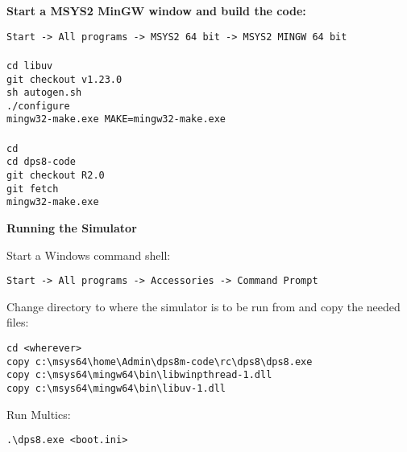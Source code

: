 \textbf{Start a MSYS2 MinGW window and build the code:}

\begin{adjustwidth}{5ex}{1ex}
    \texttt{Start -> All programs -> MSYS2 64 bit -> MSYS2 MINGW 64 bit} \\
\\
    \texttt{cd libuv} \\
    \texttt{git checkout v1.23.0} \\
    \texttt{sh autogen.sh} \\
    \texttt{./configure} \\
    \texttt{mingw32-make.exe MAKE=mingw32-make.exe} \\
\\
    \texttt{cd} \\
    \texttt{cd dps8-code} \\
    \texttt{git checkout R2.0} \\
    \texttt{git fetch} \\
    \texttt{mingw32-make.exe} \\
\end{adjustwidth}  

\textbf{Running the Simulator}

Start a Windows command shell:

\begin{adjustwidth}{5ex}{1ex}
    \texttt{Start -> All programs -> Accessories -> Command Prompt} \\
\end{adjustwidth}  

Change directory to where the simulator is to be run from and copy the needed files:

\begin{adjustwidth}{5ex}{1ex}
    \texttt{cd <wherever>} \\
    \texttt{copy c:\textbackslash{}msys64\textbackslash{}home\textbackslash{}Admin\textbackslash{}dps8m-code\textbackslash{}rc\textbackslash{}dps8\textbackslash{}dps8.exe} \\
    \texttt{copy c:\textbackslash{}msys64\textbackslash{}mingw64\textbackslash{}bin\textbackslash{}libwinpthread-1.dll} \\
    \texttt{copy c:\textbackslash{}msys64\textbackslash{}mingw64\textbackslash{}bin\textbackslash{}libuv-1.dll} \\
\end{adjustwidth}  

Run Multics:

\begin{adjustwidth}{5ex}{1ex}
    \texttt{.\textbackslash{}dps8.exe <boot.ini>} \\
\end{adjustwidth}  

